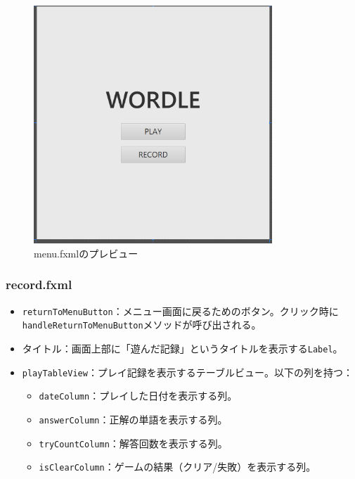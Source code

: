 \documentclass[a4j]{ujarticle}
\begin{document}
\begin{figure}[h]
\centering
\includegraphics[width=0.8\textwidth]{menu_preview.png}
\caption{menu.fxmlのプレビュー}
\label{fig:menu_fxml}
\end{figure}

\subsubsection{record.fxml}

\begin{itemize}
  \item \texttt{returnToMenuButton}：メニュー画面に戻るためのボタン。クリック時に\texttt{handleReturnToMenuButton}メソッドが呼び出される。
  \item タイトル：画面上部に「遊んだ記録」というタイトルを表示する\texttt{Label}。
  \item \texttt{playTableView}：プレイ記録を表示するテーブルビュー。以下の列を持つ：
  \begin{itemize}
    \item \texttt{dateColumn}：プレイした日付を表示する列。
    \item \texttt{answerColumn}：正解の単語を表示する列。
    \item \texttt{tryCountColumn}：解答回数を表示する列。
    \item \texttt{isClearColumn}：ゲームの結果（クリア/失敗）を表示する列。
  \end{itemize}
\end{itemize}
\end{document}
